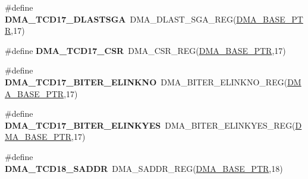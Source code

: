 \begin{DoxyCompactItemize}
\item 
\hypertarget{group___d_m_a___register___accessor___macros_ga180a83447f4810c0a69a63026af1c6c6}{}\#define {\bfseries D\+M\+A\+\_\+\+T\+C\+D17\+\_\+\+D\+L\+A\+S\+T\+S\+G\+A}~D\+M\+A\+\_\+\+D\+L\+A\+S\+T\+\_\+\+S\+G\+A\+\_\+\+R\+E\+G(\hyperlink{group___d_m_a___peripheral_ga6997fbc1b1973e9f27170217a3bd6f22}{D\+M\+A\+\_\+\+B\+A\+S\+E\+\_\+\+P\+T\+R},17)\label{group___d_m_a___register___accessor___macros_ga180a83447f4810c0a69a63026af1c6c6}

\item 
\hypertarget{group___d_m_a___register___accessor___macros_ga9bcf532205251594ecf85bf546a1e6ae}{}\#define {\bfseries D\+M\+A\+\_\+\+T\+C\+D17\+\_\+\+C\+S\+R}~D\+M\+A\+\_\+\+C\+S\+R\+\_\+\+R\+E\+G(\hyperlink{group___d_m_a___peripheral_ga6997fbc1b1973e9f27170217a3bd6f22}{D\+M\+A\+\_\+\+B\+A\+S\+E\+\_\+\+P\+T\+R},17)\label{group___d_m_a___register___accessor___macros_ga9bcf532205251594ecf85bf546a1e6ae}

\item 
\hypertarget{group___d_m_a___register___accessor___macros_gaa98838e9f1c7c6b87d3848ff9ec6c158}{}\#define {\bfseries D\+M\+A\+\_\+\+T\+C\+D17\+\_\+\+B\+I\+T\+E\+R\+\_\+\+E\+L\+I\+N\+K\+N\+O}~D\+M\+A\+\_\+\+B\+I\+T\+E\+R\+\_\+\+E\+L\+I\+N\+K\+N\+O\+\_\+\+R\+E\+G(\hyperlink{group___d_m_a___peripheral_ga6997fbc1b1973e9f27170217a3bd6f22}{D\+M\+A\+\_\+\+B\+A\+S\+E\+\_\+\+P\+T\+R},17)\label{group___d_m_a___register___accessor___macros_gaa98838e9f1c7c6b87d3848ff9ec6c158}

\item 
\hypertarget{group___d_m_a___register___accessor___macros_ga56e17d238821e5c25bff444c65888e58}{}\#define {\bfseries D\+M\+A\+\_\+\+T\+C\+D17\+\_\+\+B\+I\+T\+E\+R\+\_\+\+E\+L\+I\+N\+K\+Y\+E\+S}~D\+M\+A\+\_\+\+B\+I\+T\+E\+R\+\_\+\+E\+L\+I\+N\+K\+Y\+E\+S\+\_\+\+R\+E\+G(\hyperlink{group___d_m_a___peripheral_ga6997fbc1b1973e9f27170217a3bd6f22}{D\+M\+A\+\_\+\+B\+A\+S\+E\+\_\+\+P\+T\+R},17)\label{group___d_m_a___register___accessor___macros_ga56e17d238821e5c25bff444c65888e58}

\item 
\hypertarget{group___d_m_a___register___accessor___macros_ga712944138850e41ab505566788f23220}{}\#define {\bfseries D\+M\+A\+\_\+\+T\+C\+D18\+\_\+\+S\+A\+D\+D\+R}~D\+M\+A\+\_\+\+S\+A\+D\+D\+R\+\_\+\+R\+E\+G(\hyperlink{group___d_m_a___peripheral_ga6997fbc1b1973e9f27170217a3bd6f22}{D\+M\+A\+\_\+\+B\+A\+S\+E\+\_\+\+P\+T\+R},18)\label{group___d_m_a___register___accessor___macros_ga712944138850e41ab505566788f23220}


\end{DoxyCompactItemize}
